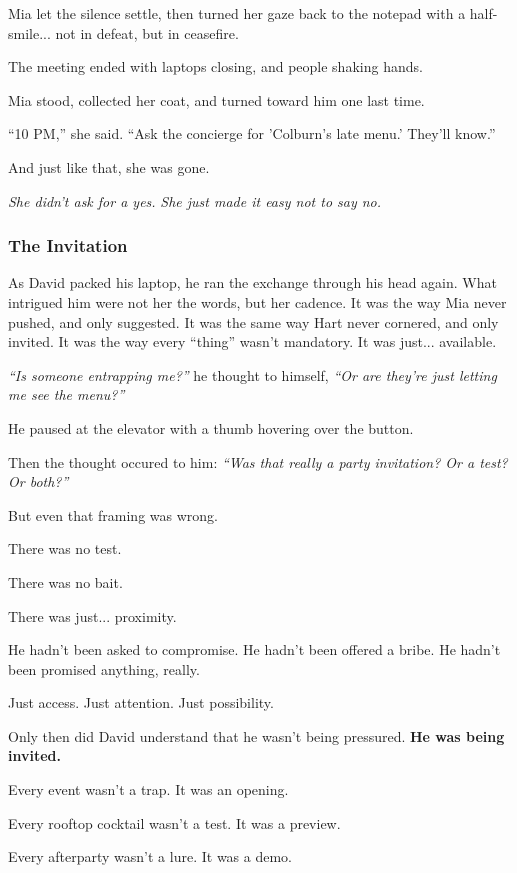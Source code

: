 Mia let the silence settle, then turned her gaze back to the notepad with a half-smile... not in defeat, but in ceasefire.

The meeting ended with laptops closing, and people shaking hands.

Mia stood, collected her coat, and turned toward him one last time.

``10 PM,'' she said. ``Ask the concierge for 'Colburn’s late menu.' They'll know.''

And just like that, she was gone.

\textit{She didn’t ask for a yes.}
\textit{She just made it easy not to say no.}

\subsubsection{The Invitation}

As David packed his laptop, he ran the exchange through his head again. What intrigued him were not her the words, 
but her cadence. It was the way Mia never pushed, and only suggested. It was the same way Hart never cornered, and only 
invited. It was the way every ``thing'' wasn’t mandatory. It was just... available.

\textit{``Is someone entrapping me?''} he thought to himself, \textit{``Or are they’re just letting me see the menu?''}

He paused at the elevator with a thumb hovering over the button.

Then the thought occured to him: \textit{``Was that really a party invitation? Or a test? Or both?''}

But even that framing was wrong.

There was no test.

There was no bait.

There was just... proximity.

He hadn’t been asked to compromise.
He hadn’t been offered a bribe.
He hadn’t been promised anything, really.

Just access.
Just attention.
Just possibility.

Only then did David understand that he wasn't being pressured. \textbf{He was being invited.}

Every event wasn’t a trap. It was an opening.

Every rooftop cocktail wasn’t a test. It was a preview.  

Every afterparty wasn’t a lure. It was a demo.  

